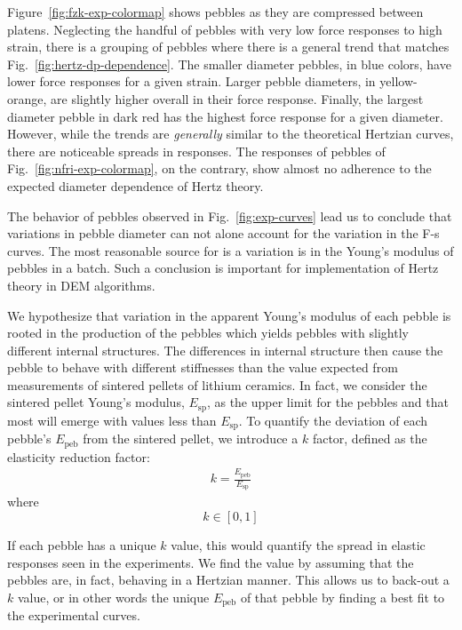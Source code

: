 Figure~\ref{fig:fzk-exp-colormap} shows \lis pebbles as they are compressed between platens. Neglecting the handful of pebbles with very low force responses to high strain, there is a grouping of pebbles where there is a general trend that matches Fig.~\ref{fig:hertz-dp-dependence}. The smaller diameter pebbles, in blue colors, have lower force responses for a given strain. Larger pebble diameters, in yellow-orange, are slightly higher overall in their force response. Finally, the largest diameter pebble in dark red has the highest force response for a given diameter. However, while the trends are \textit{generally} similar to the theoretical Hertzian curves, there are noticeable spreads in responses. The responses of \lit pebbles of Fig.~\ref{fig:nfri-exp-colormap}, on the contrary, show almost no adherence to the expected diameter dependence of Hertz theory. 

The behavior of pebbles observed in Fig.~\ref{fig:exp-curves} lead us to conclude that variations in pebble diameter can not alone account for the variation in the F-s curves. The most reasonable source for is a variation is in the Young's modulus of pebbles in a batch. Such a conclusion is important for implementation of Hertz theory in DEM algorithms.

We hypothesize that variation in the apparent Young's modulus of each pebble is rooted in the production of the pebbles which yields pebbles with slightly different internal structures. The differences in internal structure then cause the pebble to behave with different stiffnesses than the value expected from measurements of sintered pellets of lithium ceramics. In fact, we consider the sintered pellet Young's modulus, $E_\text{sp}$, as the upper limit for the pebbles and that most will emerge with values less than $E_\text{sp}$. To quantify the deviation of each pebble's $E_\text{peb}$ from the sintered pellet, we introduce a $k$ factor, defined as the elasticity reduction factor:
\begin{align}
k = \frac{E_\text{peb}}{E_\text{sp}}
\end{align}
where
\[
k \in [0,1]
\]

If each pebble has a unique $k$ value, this would quantify the spread in elastic responses seen in the experiments. We find the value by assuming that the pebbles are, in fact, behaving in a Hertzian manner. This allows us to back-out a $k$ value, or in other words the unique $E_\text{peb}$ of that pebble by finding a best fit to the experimental curves. 

